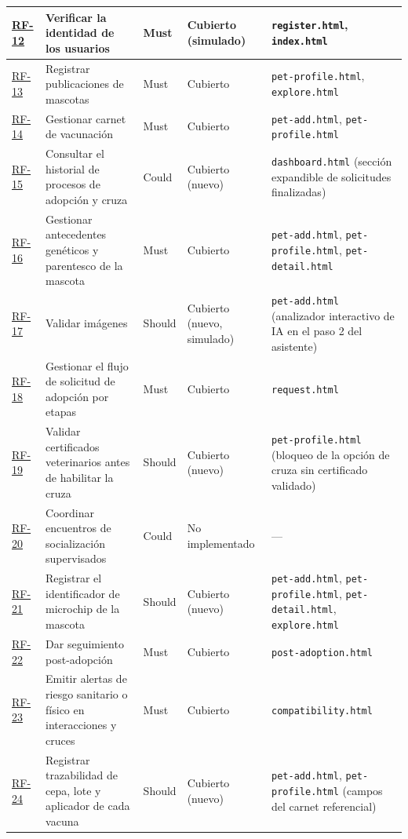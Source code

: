 \documentclass[journal,onecolumn]{IEEEtran}
\begin{document}
\begin{longtable}{@{}p{1.5cm} p{5.2cm} p{1.7cm} p{3.0cm} p{3.4cm}@{}}
		\hline
		\hyperref[tab:RF-12]{RF-12} & Verificar la identidad de los usuarios & Must & Cubierto (simulado) & \texttt{register.html}, \texttt{index.html} \\
		\hline
		\hyperref[tab:RF-13]{RF-13} & Registrar publicaciones de mascotas & Must & Cubierto & \texttt{pet-profile.html}, \texttt{explore.html} \\
		\hline
		\hyperref[tab:RF-14]{RF-14} & Gestionar carnet de vacunación & Must & Cubierto & \texttt{pet-add.html}, \texttt{pet-profile.html} \\
		\hline
		\hyperref[tab:RF-15]{RF-15} & Consultar el historial de procesos de adopción y cruza & Could & Cubierto (nuevo) & \texttt{dashboard.html} (sección expandible de solicitudes finalizadas) \\
		\hline
		\hyperref[tab:RF-16]{RF-16} & Gestionar antecedentes genéticos y parentesco de la mascota & Must & Cubierto & \texttt{pet-add.html}, \texttt{pet-profile.html}, \texttt{pet-detail.html} \\
		\hline
		\hyperref[tab:RF-17]{RF-17} & Validar imágenes & Should & Cubierto (nuevo, simulado) & \texttt{pet-add.html} (analizador interactivo de IA en el paso 2 del asistente) \\
		\hline
		\hyperref[tab:RF-18]{RF-18} & Gestionar el flujo de solicitud de adopción por etapas & Must & Cubierto & \texttt{request.html} \\
		\hline
		\hyperref[tab:RF-19]{RF-19} & Validar certificados veterinarios antes de habilitar la cruza & Should & Cubierto (nuevo) & \texttt{pet-profile.html} (bloqueo de la opción de cruza sin certificado validado) \\
		\hline
		\hyperref[tab:RF-20]{RF-20} & Coordinar encuentros de socialización supervisados & Could & No implementado & --- \\
		\hline
		\hyperref[tab:RF-21]{RF-21} & Registrar el identificador de microchip de la mascota & Should & Cubierto (nuevo) & \texttt{pet-add.html}, \texttt{pet-profile.html}, \texttt{pet-detail.html}, \texttt{explore.html} \\
		\hline
		\hyperref[tab:RF-22]{RF-22} & Dar seguimiento post-adopción & Must & Cubierto & \texttt{post-adoption.html} \\
		\hline
		\hyperref[tab:RF-23]{RF-23} & Emitir alertas de riesgo sanitario o físico en interacciones y cruces & Must & Cubierto & \texttt{compatibility.html} \\
		\hline
		\hyperref[tab:RF-24]{RF-24} & Registrar trazabilidad de cepa, lote y aplicador de cada vacuna & Should & Cubierto (nuevo) & \texttt{pet-add.html}, \texttt{pet-profile.html} (campos del carnet referencial) \\

\end{longtable}
\end{document}
